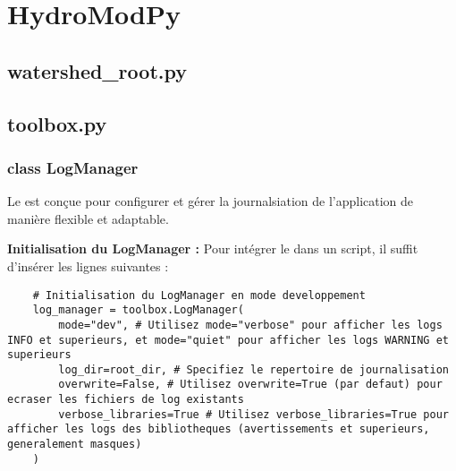 
\chapter{HydroModPy}
\label{chap:hydromodpy}

\minitableofcontents

\newpage


\section{watershed\_root.py}
\label{sec:watershed_root_py}

\section{toolbox.py}
\label{sec:toolbox_py}

\subsection{class LogManager}
\label{sec:logmanager}

Le  est conçue pour configurer et gérer la journalsiation de l'application de manière flexible et adaptable.

\vspace{1em}

\noindent\textbf{Initialisation du LogManager :}
Pour intégrer le  dans un script, il suffit d'insérer les lignes suivantes :

\begin{verbatim}
    # Initialisation du LogManager en mode developpement
    log_manager = toolbox.LogManager( 
        mode="dev", # Utilisez mode="verbose" pour afficher les logs INFO et superieurs, et mode="quiet" pour afficher les logs WARNING et superieurs 
        log_dir=root_dir, # Specifiez le repertoire de journalisation 
        overwrite=False, # Utilisez overwrite=True (par defaut) pour ecraser les fichiers de log existants 
        verbose_libraries=True # Utilisez verbose_libraries=True pour afficher les logs des bibliotheques (avertissements et superieurs, generalement masques) 
    )
\end{verbatim}

